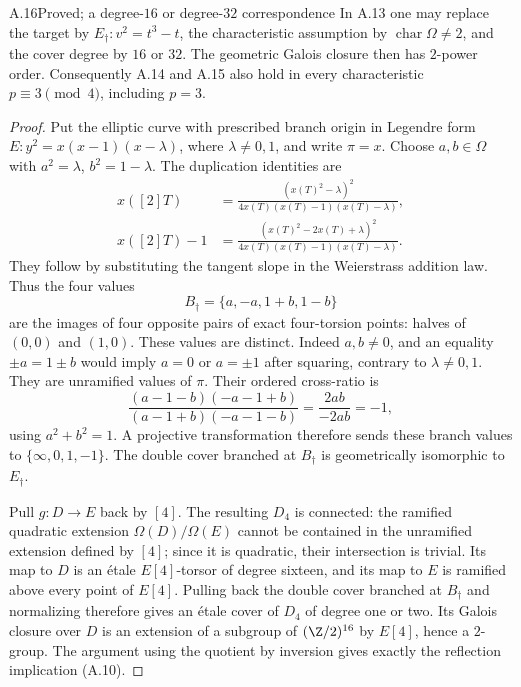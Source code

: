 \begin{claim}{A.16}{Proved; a degree-$16$ or degree-$32$ correspondence}
In A.13 one may replace the target by
$E_\dagger:v^2=t^3-t$, the characteristic assumption by
$\operatorname{char}\Omega\ne2$, and the cover degree by $16$ or
$32$. The geometric Galois closure then has $2$-power order.
Consequently A.14 and A.15 also hold in every characteristic
$p\equiv3\pmod4$, including $p=3$.
\end{claim}
\begin{proof}
Put the elliptic curve with prescribed branch origin in Legendre
form $E:y^2=x(x-1)(x-\lambda)$, where $\lambda\ne0,1$, and
write $\pi=x$. Choose $a,b\in\Omega$ with
$a^2=\lambda$, $b^2=1-\lambda$. The duplication identities are
\[
\begin{aligned}
 x([2]T)&=\frac{(x(T)^2-\lambda)^2}
                   {4x(T)(x(T)-1)(x(T)-\lambda)},\\
 x([2]T)-1&=\frac{(x(T)^2-2x(T)+\lambda)^2}
                   {4x(T)(x(T)-1)(x(T)-\lambda)}.
\end{aligned}
\]
They follow by substituting the tangent slope in the Weierstrass
addition law. Thus the four values
\[
 B_\dagger=\{a,-a,1+b,1-b\}
\]
are the images of four opposite pairs of exact four-torsion
points: halves of $(0,0)$ and $(1,0)$. These values are distinct.
Indeed $a,b\ne0$, and an equality $\pm a=1\pm b$ would imply
$a=0$ or $a=\pm1$ after squaring, contrary to $\lambda\ne0,1$.
They are unramified values of $\pi$. Their ordered cross-ratio is
\[
 \frac{(a-1-b)(-a-1+b)}{(a-1+b)(-a-1-b)}
       =\frac{2ab}{-2ab}=-1,
\]
using $a^2+b^2=1$. A projective transformation therefore sends
these branch values to $\{\infty,0,1,-1\}$. The double cover
branched at $B_\dagger$ is geometrically isomorphic to
$E_\dagger$.

Pull $g:D\to E$ back by $[4]$. The resulting $D_4$ is connected:
the ramified quadratic extension $\Omega(D)/\Omega(E)$ cannot
be contained in the unramified extension defined by $[4]$;
since it is quadratic, their intersection is trivial. Its map
to $D$ is an \'etale $E[4]$-torsor of degree sixteen, and its
map to $E$ is ramified above every point of $E[4]$.
Pulling back the double cover branched at $B_\dagger$ and
normalizing therefore gives an \'etale cover of $D_4$ of
degree one or two. Its Galois closure over $D$ is an extension
of a subgroup of $(\Z/2)^{16}$ by $E[4]$, hence a $2$-group.
The argument using the quotient by inversion gives exactly
the reflection implication (A.10).


\end{proof}
